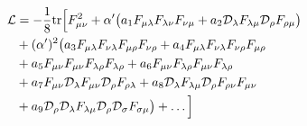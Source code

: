 \begin{equation}\begin{split}
{\cal L} &= -\frac18{\rm tr}\Big[F_{\mu\nu}^2 + \alpha'\big(a_1F_{\mu\lambda}F_{\lambda\nu}F_{\nu\mu}
+a_2{\cal D}_\lambda F_{\lambda\mu}{\cal D}_\rho F_{\rho\mu}\big)\\&
+(\alpha')^2\big(a_3F_{\mu\lambda}F_{\nu\lambda}F_{\mu\rho}F_{\nu\rho}
+a_4F_{\mu\lambda}F_{\nu\lambda}F_{\nu\rho}F_{\mu\rho}\\
&+a_5F_{\mu\nu}F_{\mu\nu}F_{\lambda\rho}F_{\lambda\rho}
+a_6F_{\mu\nu}F_{\lambda\rho}F_{\mu\nu}F_{\lambda\rho}\\
&+a_7F_{\mu\nu}{\cal D}_\lambda F_{\mu\nu}{\cal D}_\rho
F_{\rho\lambda} + a_8 {\cal D}_\lambda F_{\lambda \mu}{\cal D}_\rho
F_{\rho\nu}F_{\mu\nu} \\
&+a_9{\cal D}_\rho{\cal D}_\lambda F_{\lambda\mu}{\cal D}_\rho {\cal D}_\sigma F_{\sigma\mu}\big)+\ldots \Big]
\end{split}\end{equation}

